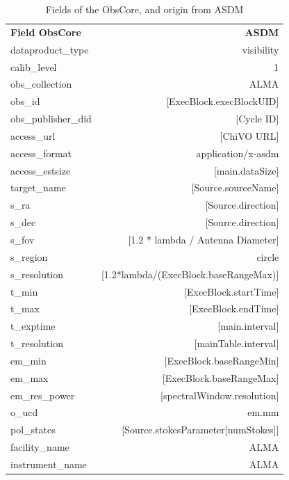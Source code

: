 \documentclass[]{spie}
\begin{document}
\begin{table}[h]
\caption{Fields of the ObsCore, and origin from ASDM} 
\label{tab:obsasdm}
\begin{center}       
\begin{tabular}{lr}
        \textbf{Field ObsCore} & \textbf{ASDM} \\
        dataproduct\_type      & visibility \\
        calib\_level           & 1 \\
        obs\_collection        & ALMA \\
        obs\_id                & [ExecBlock.execBlockUID] \\
        obs\_publisher\_did    & [Cycle ID] \\
        access\_url            & [ChiVO URL] \\
        access\_format         & application/x-asdm \\
        access\_estsize        & [main.dataSize] \\
        target\_name           & [Source.sourceName] \\
        s\_ra                  & [Source.direction] \\
        s\_dec                 & [Source.direction] \\
        s\_fov                 & [1.2 * lambda / Antenna Diameter] \\
        s\_region              & circle \\
        s\_resolution          & [1.2*lambda/(ExecBlock.baseRangeMax)] \\
        t\_min                 & [ExecBlock.startTime] \\
        t\_max                 & [ExecBlock.endTime] \\
        t\_exptime             & [main.interval] \\
        t\_resolution          & [mainTable.interval] \\
        em\_min                & [ExecBlock.baseRangeMin] \\
        em\_max                & [ExecBlock.baseRangeMax] \\
        em\_res\_power         & [spectralWindow.resolution] \\
        o\_ucd                 & em.mm \\
        pol\_states            & [Source.stokesParameter[numStokes]] \\
        facility\_name         & ALMA \\
        instrument\_name       & ALMA \\
\end{tabular}
\end{center}
\end{table}
\end{document}
